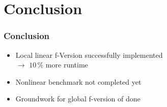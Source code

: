 \documentclass[compress,aspectratio=1610,noflama]{beamer}
\begin{document}
	\section*{Conclusion}
	\begin{frame}
		\frametitle{Conclusion}
		
		\begin{center}
			\begin{itemize}
				\item <2-> Local linear f-Version successfully implemented \\ $\rightarrow$ $10\,\%$ more runtime
				\item <3-> Nonlinear benchmark not completed yet
				\item <4-> Groundwork for global f-version of {\gkw} done
			\end{itemize}
		\end{center}
	
	\end{frame}
\end{document}
